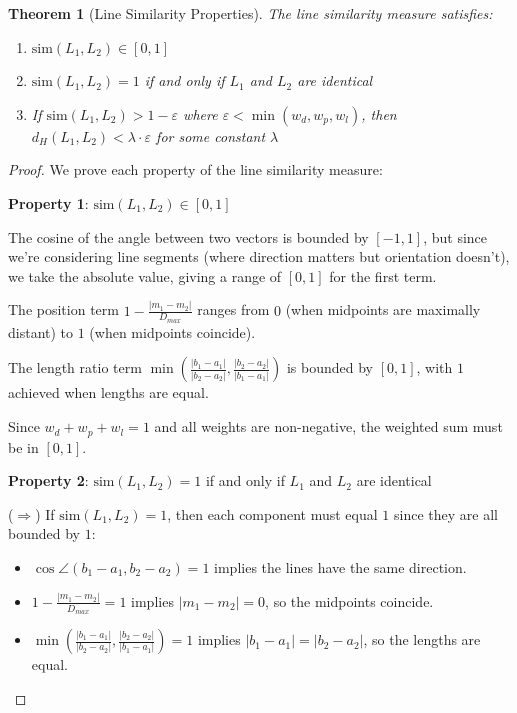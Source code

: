 \documentclass[numbers,sort]{article}
\newtheorem{theorem}{Theorem}
\begin{document}
\begin{theorem}[Line Similarity Properties]
\label{thm:line-similarity}
The line similarity measure satisfies:
\begin{enumerate}
\item $\text{sim}(L_1, L_2) \in [0, 1]$
\item $\text{sim}(L_1, L_2) = 1$ if and only if $L_1$ and $L_2$ are identical
\item If $\text{sim}(L_1, L_2) > 1 - \varepsilon$ where $\varepsilon < \min(w_d, w_p, w_l)$, then $d_H(L_1, L_2) < \lambda \cdot \varepsilon$ for some constant $\lambda$
\end{enumerate}
\end{theorem}

\begin{proof}
We prove each property of the line similarity measure:

\textbf{Property 1}: $\text{sim}(L_1, L_2) \in [0, 1]$

The cosine of the angle between two vectors is bounded by $[-1,1]$, but since we're considering line segments (where direction matters but orientation doesn't), we take the absolute value, giving a range of $[0,1]$ for the first term.

The position term $1 - \frac{|m_1 - m_2|}{D_{max}}$ ranges from $0$ (when midpoints are maximally distant) to $1$ (when midpoints coincide).

The length ratio term $\min\left(\frac{|b_1-a_1|}{|b_2-a_2|}, \frac{|b_2-a_2|}{|b_1-a_1|}\right)$ is bounded by $[0,1]$, with $1$ achieved when lengths are equal.

Since $w_d + w_p + w_l = 1$ and all weights are non-negative, the weighted sum must be in $[0,1]$.

\textbf{Property 2}: $\text{sim}(L_1, L_2) = 1$ if and only if $L_1$ and $L_2$ are identical

($\Rightarrow$) If $\text{sim}(L_1, L_2) = 1$, then each component must equal $1$ since they are all bounded by $1$:
\begin{itemize}
\item $\cos\angle(b_1-a_1, b_2-a_2) = 1$ implies the lines have the same direction.
\item $1 - \frac{|m_1 - m_2|}{D_{max}} = 1$ implies $|m_1 - m_2| = 0$, so the midpoints coincide.
\item $\min\left(\frac{|b_1-a_1|}{|b_2-a_2|}, \frac{|b_2-a_2|}{|b_1-a_1|}\right) = 1$ implies $|b_1-a_1| = |b_2-a_2|$, so the lengths are equal.
\end{itemize}


\end{proof}
\end{document}
